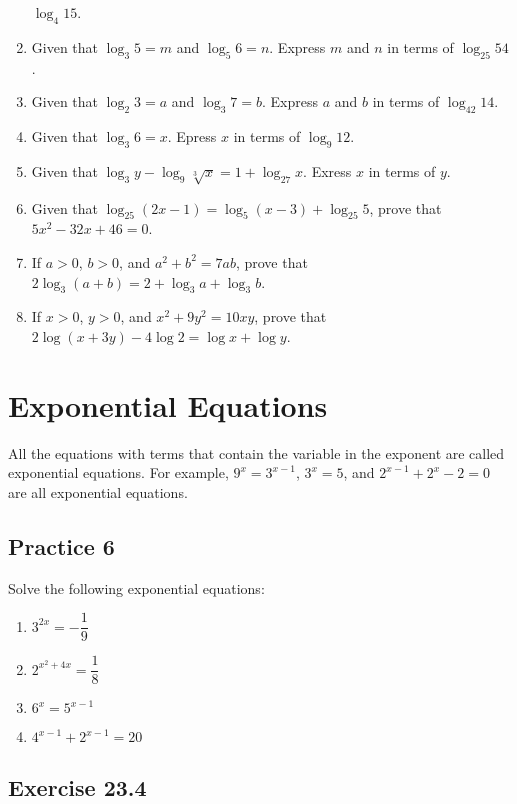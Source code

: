 \documentclass[12pt]{report}
\begin{document}
\begin{multicols}{2}
\begin{enumerate}
          $\log_4 15$.
    \item Given that $\log_3 5 = m$ and $\log_5 6 = n$. Express $m$ and $n$ in terms of
          $\log_25 54$.
    \item Given that $\log_2 3 = a$ and $\log_3 7 = b$. Express $a$ and $b$ in terms of
          $\log_42 14$.
    \item Given that $\log_3 6 = x$. Epress $x$ in terms of $\log_9 12$.
    \item Given that $\log_3 y - \log_9 \sqrt[3]{x} = 1 + \log_27 x$. Exress $x$ in terms
          of $y$.
    \item Given that $\log_25(2x - 1) = \log_5(x-3) + \log_25 5$, prove that $5x^2 - 32x
            + 46 = 0$.
    \item If $a > 0$, $b > 0$, and $a^2 + b^2 = 7ab$, prove that $2\log_3(a+b) = 2 +
            \log_3 a + \log_3 b$.
    \item If $x > 0$, $y > 0$, and $x^2 + 9y^2 = 10xy$, prove that $2\log(x+3y) - 4\log2
            = \log x + \log y$.
  \end{enumerate}
\end{multicols}

\section{Exponential Equations}

All the equations with terms that contain the variable in the exponent are
called exponential equations. For example, $9^x = 3^{x-1}$, $3^x = 5$, and
$2^{x-1} + 2^x - 2 = 0$ are all exponential equations.

\subsection*{Practice 6}

\setlength{\columnseprule}{1pt}
\setlength{\columnsep}{24pt}
\begin{multicols}{2}
  Solve the following exponential equations:
  \begin{enumerate}
    \item $3^{2x} = -\dfrac{1}{9}$
    \item $2^{x^2 + 4x} = \dfrac{1}{8}$
    \item $6^x = 5^{x-1}$
    \item $4^{x-1} + 2^{x-1} = 20$
  \end{enumerate}
\end{multicols}

\subsection*{Exercise 23.4}
\end{document}
